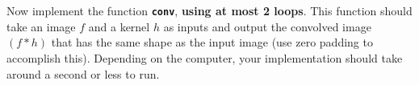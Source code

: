 \documentclass[11pt]{article}
\begin{document}
    \begin{center}
    \end{center}
    { \hspace*{\fill} \\}
    
    \begin{center}
    \end{center}
    { \hspace*{\fill} \\}
    
    Now implement the function \textbf{\texttt{conv}}, \textbf{using at most
2 loops}. This function should take an image \(f\) and a kernel \(h\) as
inputs and output the convolved image \((f*h)\) that has the same shape
as the input image (use zero padding to accomplish this). Depending on
the computer, your implementation should take around a second or less to
run.
\end{document}
